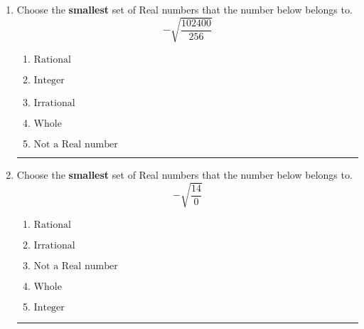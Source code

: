 \documentclass[14pt]{extbook}
\newcommand{\litem}[1]{\item#1\hspace*{-1cm}\rule{\textwidth}{0.4pt}}
\begin{document}
\begin{enumerate}
{\begin{enumerate}[label=\Alph*.]
\end{enumerate} }
\litem{
Choose the \textbf{smallest} set of Real numbers that the number below belongs to.\[ -\sqrt{\frac{102400}{256}} \]\begin{enumerate}[label=\Alph*.]
\item \( \text{Rational} \)
\item \( \text{Integer} \)
\item \( \text{Irrational} \)
\item \( \text{Whole} \)
\item \( \text{Not a Real number} \)

\end{enumerate} }
\litem{
Choose the \textbf{smallest} set of Real numbers that the number below belongs to.\[ -\sqrt{\frac{14}{0}} \]\begin{enumerate}[label=\Alph*.]
\item \( \text{Rational} \)
\item \( \text{Irrational} \)
\item \( \text{Not a Real number} \)
\item \( \text{Whole} \)
\item \( \text{Integer} \)

\end{enumerate} }
\end{enumerate}
\end{document}
